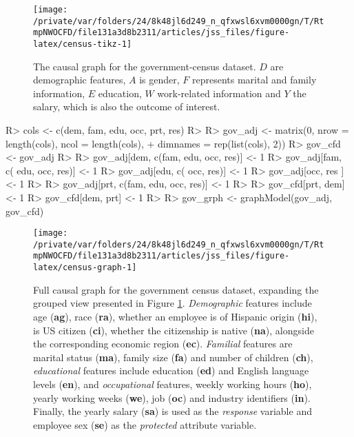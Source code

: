 \documentclass[
  nojss]{jss}
\begin{document}
\begin{CodeChunk}
\begin{figure}

{\centering \texttt{[image: /private/var/folders/24/8k48jl6d249\_n\_qfxwsl6xvm0000gn/T/RtmpNWOCFD/file131a3d8b2311/articles/jss\_files/figure-latex/census-tikz-1]} 

}

\caption[The causal graph for the government-census dataset]{The causal graph for the government-census dataset. $D$ are demographic features, $A$ is gender, $F$ represents marital and family information, $E$ education, $W$ work-related information and $Y$ the salary, which is also the outcome of interest.}\label{fig:census-tikz}
\end{figure}
\end{CodeChunk}

\begin{CodeChunk}
\begin{CodeInput}
R> cols <- c(dem, fam, edu, occ, prt, res)
R> 
R> gov_adj <- matrix(0, nrow = length(cols), ncol = length(cols),
+                   dimnames = rep(list(cols), 2))
R> gov_cfd <- gov_adj
R> 
R> gov_adj[dem, c(fam, edu, occ, res)] <- 1
R> gov_adj[fam, c(     edu, occ, res)] <- 1
R> gov_adj[edu, c(          occ, res)] <- 1
R> gov_adj[occ,                  res ] <- 1
R> 
R> gov_adj[prt, c(fam, edu, occ, res)] <- 1
R> 
R> gov_cfd[prt, dem] <- 1
R> gov_cfd[dem, prt] <- 1
R> 
R> gov_grph <- graphModel(gov_adj, gov_cfd)
\end{CodeInput}
\end{CodeChunk}

\begin{CodeChunk}
\begin{figure}

{\centering \texttt{[image: /private/var/folders/24/8k48jl6d249\_n\_qfxwsl6xvm0000gn/T/RtmpNWOCFD/file131a3d8b2311/articles/jss\_files/figure-latex/census-graph-1]} 

}

\caption{Full causal graph for the government census dataset, expanding the grouped view presented in Figure \ref{fig:census-tikz}. \textit{Demographic} features include age (\textbf{ag}), race (\textbf{ra}), whether an employee is of Hispanic origin (\textbf{hi}), is US citizen (\textbf{ci}), whether the citizenship is native (\textbf{na}), alongside the corresponding economic region (\textbf{ec}). \textit{Familial} features are marital status (\textbf{ma}), family size (\textbf{fa}) and number of children (\textbf{ch}), \textit{educational} features include education (\textbf{ed}) and English language levels (\textbf{en}), and \textit{occupational} features, weekly working hours (\textbf{ho}), yearly working weeks (\textbf{we}), job (\textbf{oc}) and industry identifiers (\textbf{in}). Finally, the yearly salary (\textbf{sa}) is used as the \textit{response} variable and employee sex (\textbf{se}) as the \textit{protected} attribute variable.}\label{fig:census-graph}
\end{figure}
\end{CodeChunk}
\end{document}
